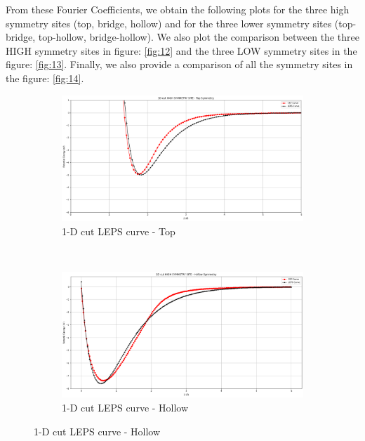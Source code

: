 \documentclass[12pt]{article}
\begin{document}
From these Fourier Coefficients, we obtain the following plots for the three high symmetry sites (top, bridge, hollow) and for the
three lower symmetry sites (top-bridge, top-hollow, bridge-hollow). We also plot the comparison between the three HIGH symmetry sites in figure: \ref{fig:12} and the three LOW symmetry sites in the figure: \ref{fig:13}. Finally, we also provide a comparison of all the symmetry sites in the figure: \ref{fig:14}.
\vspace{5mm}
\begin{figure}[h!]
    \centering
    \begin{subfigure}[t]{0.5\textwidth}
        \centering
            \includegraphics[scale = 0.2]{1dtop.png}
    \caption{1-D cut LEPS curve - Top} 
    \label{fig:6}
    \end{subfigure}%
    ~ 
    \begin{subfigure}[t]{0.5\textwidth}
        \centering
             \includegraphics[scale = 0.2]{1dhollow.png}
    \caption{1-D cut LEPS curve - Hollow} 
    \label{fig:7}
    \end{subfigure}
\end{figure}
\end{document}
